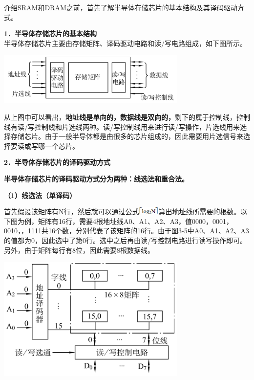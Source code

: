 介绍SRAM和DRAM之前，首先了解半导体存储芯片的基本结构及其译码驱动方式。

\textbf{{1．半导体存储芯片的基本结构}}\\

半导体存储芯片主要由存储矩阵、译码驱动电路和读/写电路组成，如下图所示。

\includegraphics[width=3.69792in,height=1.03125in]{png-jpeg-pics/ED2922D02AD866CAA8E42D2CDF94FAC7.png}

从上图中可以看出，\textbf{地址线是单向的，数据线是双向的，}剩下的属于控制线，控制线有读/写控制线和片选线两种。读/写控制线用来进行读/写操作，片选线用来选择存储芯片。由于一般半导体都是由很多的芯片组成的，因此需要用片选信号来选择要读或写哪一个芯片。

\textbf{{2．半导体存储芯片的译码驱动方式}}

\textbf{半导体存储芯片的译码驱动方式分为两种：线选法和重合法。}

\textbf{（1）线选法（单译码）}

首先假设该矩阵有N行，然后就可以通过公式\includegraphics[width=0.41667in,height=0.15625in]{png-jpeg-pics/FB018EBBCBADD70A7F1EBBA64FA6D211.png}算出地址线所需要的根数。以下图为例，矩阵有16行，需要4根地址线A0、A1、A2、A3，值0000，0001，0010，，1111共16个数，分别代表了该矩阵的16行。由于图3-5中A0、A1、A2、A3的值都为0，因此选中了第0行。选中之后再由读/写控制电路进行读写操作即可。另外，由于矩阵每行有8位，因此需要8根数据线。

\includegraphics[width=3.69792in,height=2.43750in]{png-jpeg-pics/0A06B53A95A27FD6C136C69CA2915CB8.png}

